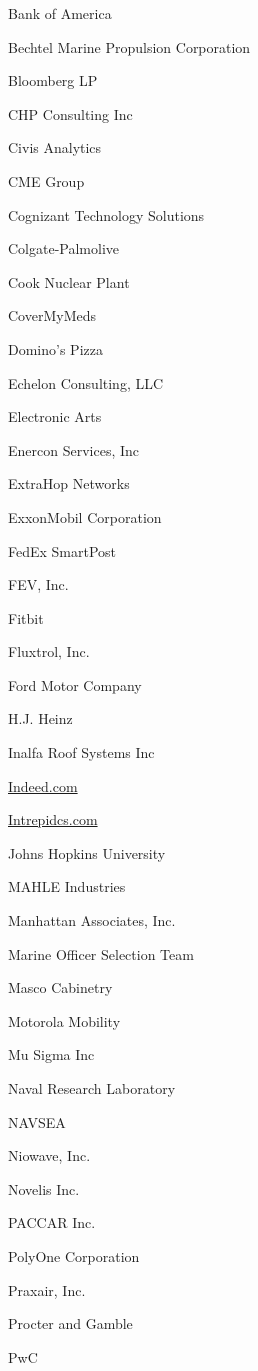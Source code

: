 \documentclass[twoside]{article}
\begin{document}
\begin{center}
\begin{multicols}{5}
\begin{FlushLeft}
\begin{compactitem}
\item Bank of America
\item Bechtel Marine Propulsion Corporation
\item Bloomberg LP
\item CHP Consulting Inc
\item Civis Analytics
\item CME Group
\item Cognizant Technology Solutions
\item Colgate-Palmolive
\item Cook Nuclear Plant
\item CoverMyMeds
\item Domino's Pizza
\item Echelon Consulting, LLC
\item Electronic Arts
\item Enercon Services, Inc
\item ExtraHop Networks
\item ExxonMobil Corporation
\item FedEx SmartPost
\item FEV, Inc.
\item Fitbit
\item Fluxtrol, Inc.
\item Ford Motor Company
\item H.J. Heinz
\item Inalfa Roof Systems Inc
\item \url{Indeed.com}
\item \url{Intrepidcs.com}
\item Johns Hopkins University
\item MAHLE Industries
\item Manhattan Associates, Inc.
\item Marine Officer Selection Team
\item Masco Cabinetry
\item Motorola Mobility
\item Mu Sigma Inc
\item Naval Research Laboratory
\item NAVSEA
\item Niowave, Inc.
\item Novelis Inc.
\item PACCAR Inc.
\item PolyOne Corporation
\item Praxair, Inc.
\item Procter and Gamble
\item PwC

\end{compactitem}
\end{FlushLeft}
\end{multicols}
\end{center}
\end{document}
